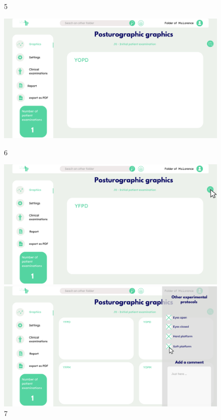 \begin{figure}[H]
\begin{minipage}{0.3\textwidth}
        \caption*{5}
    \end{minipage}
    \begin{minipage}{0.3\textwidth}
        \centering
        \includegraphics[width=\textwidth]{images/Prototype/6.png}
        \caption*{6}
    \end{minipage}
    \begin{minipage}{0.3\textwidth}
        \centering
        \includegraphics[width=\textwidth]{images/Prototype/7.png}
        \caption*{7}
    \end{minipage}
    \begin{minipage}{0.3\textwidth}
        \centering
        \includegraphics[width=\textwidth]{images/Prototype/Visualisation des données en fonction de différents protocoles expérimentaux.png}

\end{minipage}
\end{figure}

